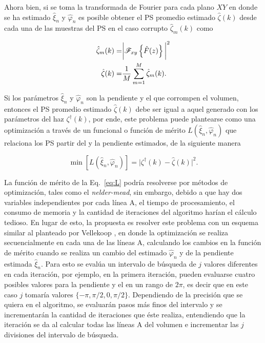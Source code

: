 Ahora bien, si se toma la transformada de Fourier para cada plano $XY$ en donde se ha estimado $\hat{\xi}_n$ y $\hat{\varphi}_n$ es posible obtener el PS promedio estimado $\hat{\zeta}(k)$ desde cada una de las muestras del PS en el caso corrupto $\hat{\zeta}_m(k)$ como

\begin{align}
\label{eq:zeta_m_y_prom}
\hat{\zeta}_m(k) = &\bigg\lvert \mathscr{F}_{xy} \left\{\hat{F}(z)\right\}\bigg\rvert^2 \notag\\
\hat{\zeta}(k) = &\frac{1}{M}\sum_{m=1}^{M} \hat{\zeta}_m(k).
\end{align}

\noindent Si los parámetros $\hat{\xi}_n$ y $\hat{\varphi}_n$ son la pendiente y el \offset que corrompen el volumen, entonces el PS promedio estimado $\hat{\zeta}(k)$ debe ser igual a aquel generado con los parámetros del haz $\zeta^{\dagger}(k)$, por ende, este problema puede plantearse como una optimización a través de un funcional o función de mérito $L(\hat{\xi}_n,\hat{\varphi}_n)$ que relaciona los PS partir del \offset y la pendiente estimados, de la siguiente manera

\begin{equation}
\label{eq:L}
\min \left[L(\hat{\xi}_n,\hat{\varphi}_n)\right] = {\bigg\lvert \zeta^{\dagger}(k) - \hat{\zeta}(k)\bigg\rvert^2}.
\end{equation}

La función de mérito de la Eq.~\ref{eq:L} podría resolverse por métodos de optimización, tales como el \textit{nelder-mead}, sin embargo, debido a que hay dos variables independientes por cada línea A, el tiempo de procesamiento, el consumo de memoria y la cantidad de iteraciones del algoritmo harían el cálculo tedioso. En lugar de esto, la propuesta es resolver este problema con un esquema similar al planteado por Vellekoop \cite{Vallekoop2007}, en donde la optimización se realiza secuencialmente en cada una de las líneas A, calculando los cambios en la función de mérito cuando se realiza un cambio del \offset estimado $\hat{\varphi}_n$ y de la pendiente estimada $\hat{\xi}_n$. Para esto se evalúa un intervalo de búsqueda de $j$ valores diferentes en cada iteración, por ejemplo, en la primera iteración, pueden evaluarse cuatro posibles valores para la pendiente y el \offset en un rango de $2\pi$, es decir que en este caso $j$ tomaría valores $\{-\pi, \pi/2, 0, \pi/2\}$. Dependiendo de la precisión que se quiera en el algoritmo, se evaluarán pasos más finos del intervalo y se incrementarán la cantidad de iteraciones que éste realiza, entendiendo que la iteración se da al calcular todas las líneas A del volumen e incrementar las $j$ divisiones del intervalo de búsqueda.

